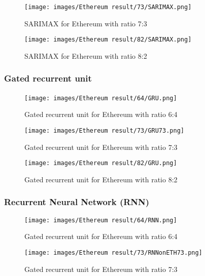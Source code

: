 \documentclass{ieeeojies}
\begin{document}
\begin{figure}[H]
  \centering
\texttt{[image: images/Ethereum result/73/SARIMAX.png]}\\
  \caption{SARIMAX for Ethereum with ratio 7:3}
  \label{fig:sarimax_eth_73}
\end{figure}

\begin{figure}[H]
  \centering
\texttt{[image: images/Ethereum result/82/SARIMAX.png]}\\
  \caption{SARIMAX for Ethereum with ratio 8:2}
  \label{fig:sarimax_eth_73}
\end{figure}

\subsubsection{Gated recurrent unit}
\begin{figure}[H]
  \centering
\texttt{[image: images/Ethereum result/64/GRU.png]}\
  \caption{Gated recurrent unit for Ethereum with ratio 6:4}
  \label{fig:gru_eth_64}
\end{figure}

\begin{figure}[H]
  \centering
\texttt{[image: images/Ethereum result/73/GRU73.png]}\\
  \caption{Gated recurrent unit for Ethereum with ratio 7:3}
  \label{fig:gru_eth_73}
\end{figure}

\begin{figure}[H]
  \centering
\texttt{[image: images/Ethereum result/82/GRU.png]}\\
  \caption{Gated recurrent unit for Ethereum with ratio 8:2}
  \label{fig:gru_eth_82}
\end{figure}


\subsubsection{Recurrent Neural Network (RNN)}

\begin{figure}[H]
  \centering
\texttt{[image: images/Ethereum result/64/RNN.png]}\\
  \caption{Gated recurrent unit for Ethereum with ratio 6:4}
  \label{fig:rnn_eth_64}
\end{figure}

\begin{figure}[H]
  \centering
\texttt{[image: images/Ethereum result/73/RNNonETH73.png]}\\
  \caption{Gated recurrent unit for Ethereum with ratio 7:3}
  \label{fig:rnn_eth_73}
\end{figure}
\end{document}
